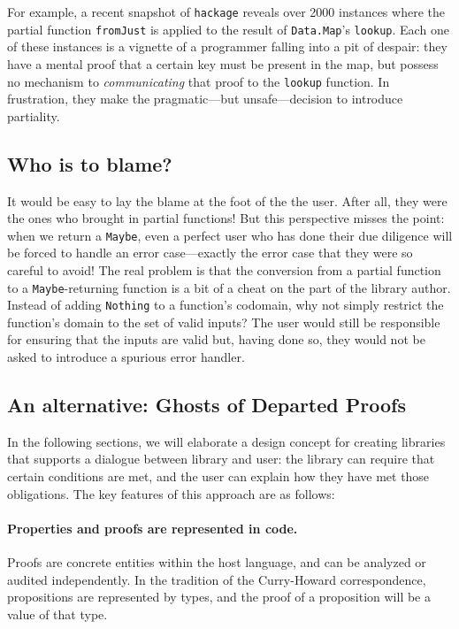 \documentclass[format=sigplan, review=false, screen=true]{acmart}
\begin{document}
For example, a recent snapshot of \texttt{hackage}
reveals over 2000 instances where the partial function
\texttt{fromJust} is applied to the
result of \texttt{Data.Map}'s \texttt{lookup}. Each one
of these instances is a vignette of a programmer
falling into a pit of despair:
they have a mental proof that a certain key must be
present in the map, but possess no mechanism to
\emph{communicating} that proof to the
\texttt{lookup} function. In frustration, they make the
pragmatic---but unsafe---decision to introduce partiality.

\subsection{Who is to blame?}
It would be easy to lay the blame at the foot of the the user.
After all, they were the ones who brought in partial functions!
But this perspective misses the point: when we return a \texttt{Maybe},
even a perfect user who has done their due diligence will be forced to handle an error case---exactly the
error case that they were so careful to avoid! The real problem is
that the conversion from a partial function to a \texttt{Maybe}-returning function is
a bit of a cheat on the part of the library author. Instead of
adding \texttt{Nothing} to a function's codomain, why not simply
restrict the function's domain to the set of valid inputs?
The user would still be responsible for ensuring that the inputs are valid but,
having done so, they would not be asked to introduce a spurious error handler.


\subsection{An alternative: Ghosts of Departed Proofs}
In the following sections, we will elaborate a design concept for
creating libraries that supports a dialogue between
 library and  user: the library can require that certain conditions
are met, and the user can explain how they have met those obligations.
The key features of this approach are as follows:
\paragraph{Properties and proofs are represented in code.}
  Proofs are concrete entities within the host language, and can
  be analyzed or audited independently. In the tradition of
  the Curry-Howard correspondence, propositions are represented
  by types, and the proof of a proposition will be a value of that type.
\end{document}
